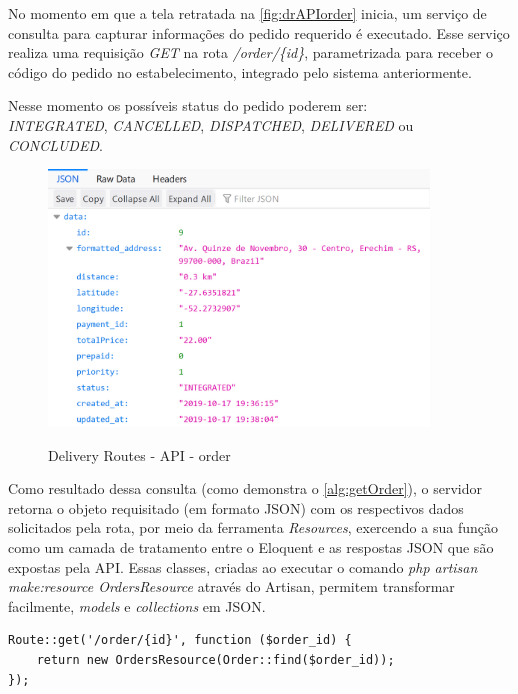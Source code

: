 No momento em que a tela retratada na \autoref{fig:drAPIorder} inicia, um serviço de consulta para capturar informações do pedido requerido é executado. Esse serviço realiza uma requisição \textit{GET} na rota \textit{/order/\{id\}}, parametrizada para receber o código do pedido no estabelecimento, integrado pelo sistema anteriormente.

Nesse momento os possíveis status do pedido poderem ser: 
\\ \textit{INTEGRATED}, \textit{CANCELLED}, \textit{DISPATCHED}, \textit{DELIVERED} ou \textit{CONCLUDED}.

\begin{figure}[H]
    \centering
    \caption{Delivery Routes - API - order}
    \includegraphics[width=0.9\textwidth]{./dados/figuras/fig22}
    \label{fig:drAPIorder}
\end{figure}

Como resultado dessa consulta (como demonstra o \autoref{alg:getOrder}), o servidor retorna o objeto requisitado (em formato JSON) com os respectivos dados solicitados pela rota, por meio da ferramenta  \textit{Resources}, exercendo a sua função como um camada de tratamento entre o Eloquent e as respostas JSON que são expostas pela API. Essas classes, criadas ao executar o comando \textit{php artisan make:resource OrdersResource} através do Artisan, permitem transformar facilmente, \textit{models} e \textit{collections} em JSON.

\begin{lstlisting}[caption={Delivery Routes - Route order}, style=htmlcssjs, label=alg:getOrder]
Route::get('/order/{id}', function ($order_id) {
    return new OrdersResource(Order::find($order_id));
});
\end{lstlisting}